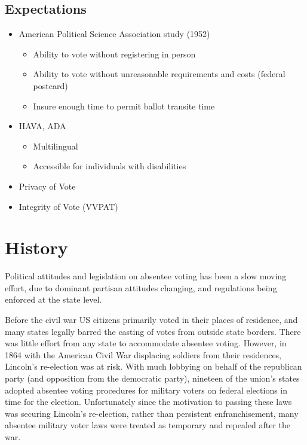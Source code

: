 \subsection{Expectations}

\begin{itemize}
\item American Political Science Association study (1952)
  \begin{itemize}
  \item Ability to vote without registering in person
  \item Ability to vote without unreasonable requirements and costs (federal postcard)
  \item Insure enough time to permit ballot transite time
  \end{itemize}
\item HAVA, ADA
\begin{itemize}
  \item Multilingual
  \item Accessible for individuals with disabilities
\end{itemize}
\item Privacy of Vote
\item Integrity of Vote (VVPAT)
\end{itemize}

\section{History}
Political attitudes and legislation on absentee voting has been a slow moving 
effort, due to dominant partisan attitudes changing, and regulations being 
enforced at the state level.

Before the civil war US citizens primarily voted in their places of residence, and many states legally barred the casting of votes from outside state borders. There was little effort from any state to accommodate absentee voting. However, in 1864 with the American Civil War displacing soldiers from their residences, Lincoln's re-election was at risk. With much lobbying on behalf of the republican party (and opposition from the democratic party), nineteen of the union's states adopted absentee voting procedures for military voters on federal elections in time for the election. Unfortunately since the motivation to passing these laws was securing Lincoln's re-election, rather than persistent enfranchisement, many absentee military voter laws were treated as temporary and repealed after the war.

